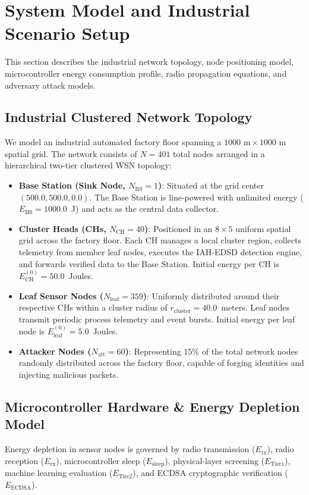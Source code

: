 \documentclass[journal]{IEEEtran}
\begin{document}
\section{System Model and Industrial Scenario Setup}
\label{sec_system_model}

This section describes the industrial network topology, node positioning model, microcontroller energy consumption profile, radio propagation equations, and adversary attack models.

\subsection{Industrial Clustered Network Topology}
We model an industrial automated factory floor spanning a $1000\text{ m} \times 1000\text{ m}$ spatial grid. The network consists of $N = 401$ total nodes arranged in a hierarchical two-tier clustered WSN topology:
\begin{itemize}
    \item \textbf{Base Station (Sink Node, $N_{\text{BS}} = 1$)}: Situated at the grid center $(500.0, 500.0, 0.0)$. The Base Station is line-powered with unlimited energy ($E_{\text{BS}} = 1000.0$~J) and acts as the central data collector.
    \item \textbf{Cluster Heads (CHs, $N_{\text{CH}} = 40$)}: Positioned in an $8 \times 5$ uniform spatial grid across the factory floor. Each CH manages a local cluster region, collects telemetry from member leaf nodes, executes the IAH-EDSD detection engine, and forwards verified data to the Base Station. Initial energy per CH is $E_{\text{CH}}^{(0)} = 50.0$~Joules.
    \item \textbf{Leaf Sensor Nodes ($N_{\text{leaf}} = 359$)}: Uniformly distributed around their respective CHs within a cluster radius of $r_{\text{cluster}} = 40.0$~meters. Leaf nodes transmit periodic process telemetry and event bursts. Initial energy per leaf node is $E_{\text{leaf}}^{(0)} = 5.0$~Joules.
    \item \textbf{Attacker Nodes ($N_{\text{att}} = 60$)}: Representing $15\%$ of the total network nodes randomly distributed across the factory floor, capable of forging identities and injecting malicious packets.
\end{itemize}

\subsection{Microcontroller Hardware \& Energy Depletion Model}
Energy depletion in sensor nodes is governed by radio transmission ($E_{\text{tx}}$), radio reception ($E_{\text{rx}}$), microcontroller sleep ($E_{\text{sleep}}$), physical-layer screening ($E_{\text{Tier1}}$), machine learning evaluation ($E_{\text{Tier2}}$), and ECDSA cryptographic verification ($E_{\text{ECDSA}}$).
\end{document}
